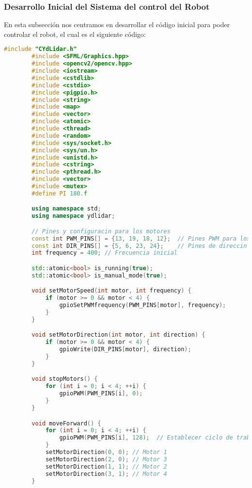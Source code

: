 \subsubsection{Desarrollo Inicial del Sistema del control del Robot}
\label{sub:Desarrollo Inicial del Sistema del control del Robot}
    En esta subsecci\'on nos centramos en desarrollar el c\'odigo inicial para poder controlar el robot, el cual es el siguiente c\'odigo:
    \vskip 0.5cm
    \begin{lstlisting}[language={C++}, caption={Primera versi\'on del c\'odigo del sistema de control del robot}, label={Script}]
        #include "CYdLidar.h"
        #include <SFML/Graphics.hpp>
        #include <opencv2/opencv.hpp>
        #include <iostream>
        #include <cstdlib>
        #include <cstdio>
        #include <pigpio.h>
        #include <string>
        #include <map>
        #include <vector>
        #include <atomic>
        #include <thread>
        #include <random>
        #include <sys/socket.h>
        #include <sys/un.h>
        #include <unistd.h>
        #include <cstring>
        #include <pthread.h>
        #include <vector>
        #include <mutex>
        #define PI 180.f

        using namespace std;
        using namespace ydlidar;

        // Pines y configuracin para los motores
        const int PWM_PINS[] = {13, 19, 18, 12};  // Pines PWM para los motores
        const int DIR_PINS[] = {5, 6, 23, 24};    // Pines de direccin para los motores
        int frequency = 400; // Frecuencia inicial

        std::atomic<bool> is_running(true);
        std::atomic<bool> is_manual_mode(true);

        void setMotorSpeed(int motor, int frequency) {
            if (motor >= 0 && motor < 4) {
                gpioSetPWMfrequency(PWM_PINS[motor], frequency);
            }
        }

        void setMotorDirection(int motor, int direction) {
            if (motor >= 0 && motor < 4) {
                gpioWrite(DIR_PINS[motor], direction);
            }
        }

        void stopMotors() {
            for (int i = 0; i < 4; ++i) {
                gpioPWM(PWM_PINS[i], 0);
            }
        }

        void moveForward() {
            for (int i = 0; i < 4; ++i) {
                gpioPWM(PWM_PINS[i], 128);  // Establecer ciclo de trabajo al 50%
            }
            setMotorDirection(0, 0); // Motor 1
            setMotorDirection(2, 0); // Motor 3
            setMotorDirection(1, 1); // Motor 2
            setMotorDirection(3, 1); // Motor 4
        }


\end{lstlisting}
